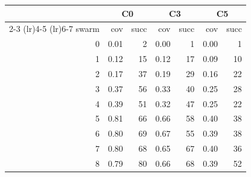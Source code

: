 \begin{tabular}{rrrrrrr}
\toprule
 & \multicolumn{2}{c}{C0} & \multicolumn{2}{c}{C3} & \multicolumn{2}{c}{C5} \\
\cmidrule(lr){2-3} \cmidrule(lr){4-5} \cmidrule(lr){6-7}
swarm & cov & succ & cov & succ & cov & succ \\
\midrule
0 & 0.01 & 2 & 0.00 & 1 & 0.00 & 1 \\
1 & 0.12 & 15 & 0.12 & 17 & 0.09 & 10 \\
2 & 0.17 & 37 & 0.19 & 29 & 0.16 & 22 \\
3 & 0.37 & 56 & 0.33 & 40 & 0.25 & 28 \\
4 & 0.39 & 51 & 0.32 & 47 & 0.25 & 22 \\
5 & 0.81 & 66 & 0.66 & 58 & 0.40 & 38 \\
6 & 0.80 & 69 & 0.67 & 55 & 0.39 & 38 \\
7 & 0.80 & 68 & 0.65 & 67 & 0.40 & 36 \\
8 & 0.79 & 80 & 0.66 & 68 & 0.39 & 52 \\
\bottomrule
\end{tabular}

